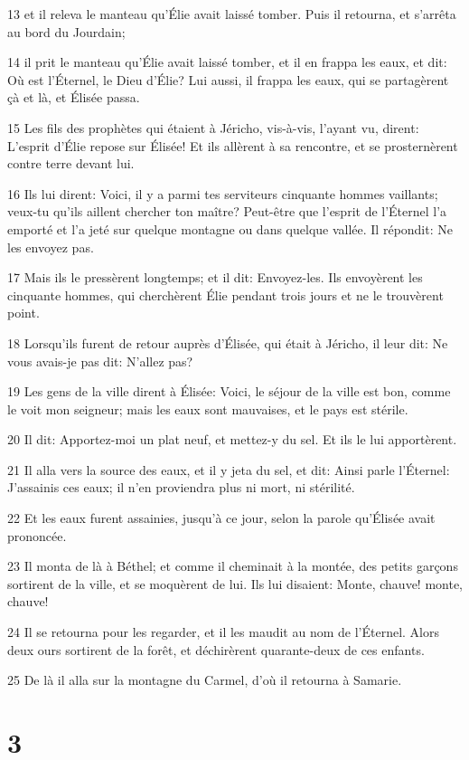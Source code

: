 \par 13 et il releva le manteau qu'Élie avait laissé tomber. Puis il retourna, et s'arrêta au bord du Jourdain;
\par 14 il prit le manteau qu'Élie avait laissé tomber, et il en frappa les eaux, et dit: Où est l'Éternel, le Dieu d'Élie? Lui aussi, il frappa les eaux, qui se partagèrent çà et là, et Élisée passa.
\par 15 Les fils des prophètes qui étaient à Jéricho, vis-à-vis, l'ayant vu, dirent: L'esprit d'Élie repose sur Élisée! Et ils allèrent à sa rencontre, et se prosternèrent contre terre devant lui.
\par 16 Ils lui dirent: Voici, il y a parmi tes serviteurs cinquante hommes vaillants; veux-tu qu'ils aillent chercher ton maître? Peut-être que l'esprit de l'Éternel l'a emporté et l'a jeté sur quelque montagne ou dans quelque vallée. Il répondit: Ne les envoyez pas.
\par 17 Mais ils le pressèrent longtemps; et il dit: Envoyez-les. Ils envoyèrent les cinquante hommes, qui cherchèrent Élie pendant trois jours et ne le trouvèrent point.
\par 18 Lorsqu'ils furent de retour auprès d'Élisée, qui était à Jéricho, il leur dit: Ne vous avais-je pas dit: N'allez pas?
\par 19 Les gens de la ville dirent à Élisée: Voici, le séjour de la ville est bon, comme le voit mon seigneur; mais les eaux sont mauvaises, et le pays est stérile.
\par 20 Il dit: Apportez-moi un plat neuf, et mettez-y du sel. Et ils le lui apportèrent.
\par 21 Il alla vers la source des eaux, et il y jeta du sel, et dit: Ainsi parle l'Éternel: J'assainis ces eaux; il n'en proviendra plus ni mort, ni stérilité.
\par 22 Et les eaux furent assainies, jusqu'à ce jour, selon la parole qu'Élisée avait prononcée.
\par 23 Il monta de là à Béthel; et comme il cheminait à la montée, des petits garçons sortirent de la ville, et se moquèrent de lui. Ils lui disaient: Monte, chauve! monte, chauve!
\par 24 Il se retourna pour les regarder, et il les maudit au nom de l'Éternel. Alors deux ours sortirent de la forêt, et déchirèrent quarante-deux de ces enfants.
\par 25 De là il alla sur la montagne du Carmel, d'où il retourna à Samarie.

\chapter{3}

